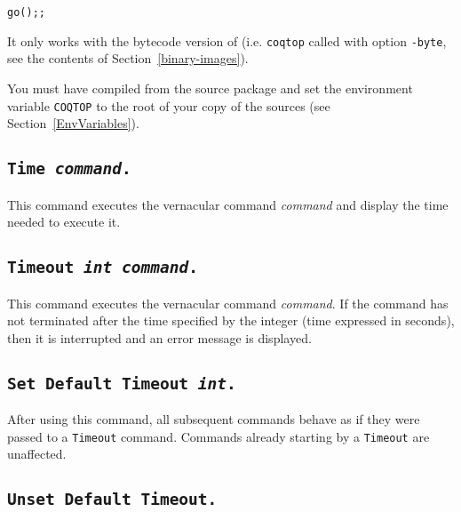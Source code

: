 \begin{flushleft}
\begin{verbatim}
go();;
\end{verbatim}
\end{flushleft}

\begin{Warnings}
\item It only works with the bytecode version of {\Coq} (i.e. {\tt coqtop} called with option {\tt -byte}, see the contents of Section~\ref{binary-images}).
\item You must have compiled {\Coq} from the source package and set the
  environment variable \texttt{COQTOP} to the root of your copy of the sources (see Section~\ref{EnvVariables}).
\end{Warnings}

\subsection[\tt Time \textrm{\textsl{command}}.]{\tt Time \textrm{\textsl{command}}.
\label{time}}
This command executes the vernacular command \textrm{\textsl{command}}
and display the time needed to execute it.


\subsection[\tt Timeout \textrm{\textsl{int}} \textrm{\textsl{command}}.]{\tt Timeout \textrm{\textsl{int}} \textrm{\textsl{command}}.
\label{timeout}}

This command executes the vernacular command \textrm{\textsl{command}}. If
the command has not terminated after the time specified by the integer
(time expressed in seconds), then it is interrupted and an error message
is displayed.

\subsection[\tt Set Default Timeout \textrm{\textsl{int}}.]{\tt Set
  Default Timeout \textrm{\textsl{int}}.}

After using this command, all subsequent commands behave as if they
were passed to a {\tt Timeout} command. Commands already starting by
a {\tt Timeout} are unaffected.

\subsection[\tt Unset Default Timeout.]{\tt Unset Default Timeout.}

